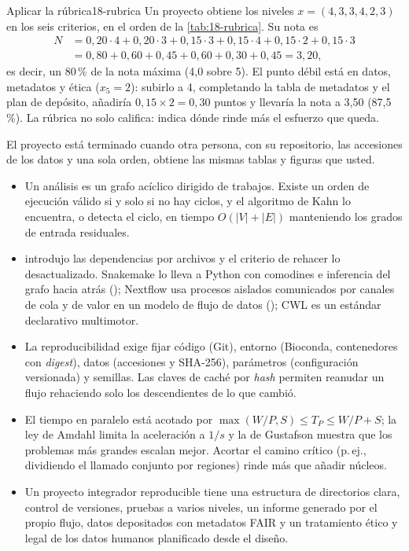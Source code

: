 \begin{ejemplo}{Aplicar la rúbrica}{18-rubrica}
Un proyecto obtiene los niveles $x=(4,3,3,4,2,3)$ en los seis criterios, en el orden de la \cref{tab:18-rubrica}. Su nota es
\begin{align*}
N &= 0{,}20\cdot4 + 0{,}20\cdot3 + 0{,}15\cdot3 + 0{,}15\cdot4 + 0{,}15\cdot2 + 0{,}15\cdot3\\
  &= 0{,}80+0{,}60+0{,}45+0{,}60+0{,}30+0{,}45 = 3{,}20,
\end{align*}
es decir, un 80\,\% de la nota máxima (4,0 sobre 5). El punto débil está en datos, metadatos y ética ($x_5=2$): subirlo a 4, completando la tabla de metadatos y el plan de depósito, añadiría $0{,}15\times2=0{,}30$ puntos y llevaría la nota a 3,50 (87,5\,\%). La rúbrica no solo califica: indica dónde rinde más el esfuerzo que queda.
\end{ejemplo}

\begin{ideaclave}
El proyecto está terminado cuando otra persona, con su repositorio, las accesiones de los datos y una sola orden, obtiene las mismas tablas y figuras que usted.
\end{ideaclave}

\begin{resumen}
\begin{itemize}
  \item Un análisis es un grafo acíclico dirigido de trabajos. Existe un orden de ejecución válido si y solo si no hay ciclos, y el algoritmo de Kahn lo encuentra, o detecta el ciclo, en tiempo $O(|V|+|E|)$ manteniendo los grados de entrada residuales.
  \item {} introdujo las dependencias por archivos y el criterio de rehacer lo desactualizado. Snakemake lo lleva a Python con comodines e inferencia del grafo hacia atrás (); Nextflow usa procesos aislados comunicados por canales de cola y de valor en un modelo de flujo de datos (); CWL es un estándar declarativo multimotor.
  \item La reproducibilidad exige fijar código (Git), entorno (Bioconda, contenedores con \emph{digest}), datos (accesiones y SHA-256), parámetros (configuración versionada) y semillas. Las claves de caché por \emph{hash} permiten reanudar un flujo rehaciendo solo los descendientes de lo que cambió.
  \item El tiempo en paralelo está acotado por $\max(W/P,S)\le T_P\le W/P+S$; la ley de Amdahl limita la aceleración a $1/s$ y la de Gustafson muestra que los problemas más grandes escalan mejor. Acortar el camino crítico (p.\,ej., dividiendo el llamado conjunto por regiones) rinde más que añadir núcleos.
  \item Un proyecto integrador reproducible tiene una estructura de directorios clara, control de versiones, pruebas a varios niveles, un informe generado por el propio flujo, datos depositados con metadatos FAIR y un tratamiento ético y legal de los datos humanos planificado desde el diseño.
\end{itemize}
\end{resumen}

